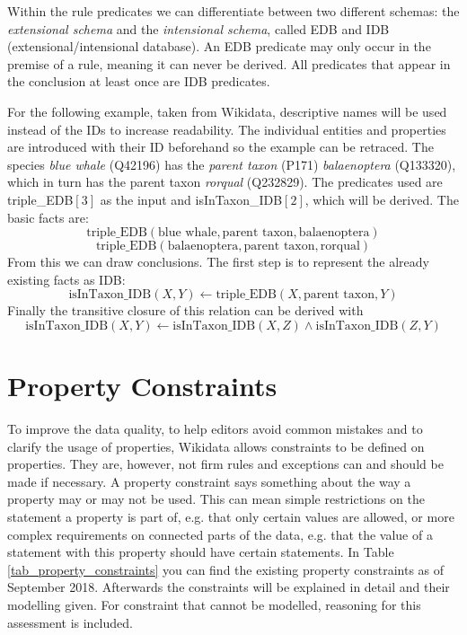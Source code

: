 \documentclass[hyperref,bachelorofscience,fleqn]{cgvpub}
\begin{document}
Within the rule predicates we can differentiate between two different schemas: the \emph{extensional schema} and the \emph{intensional schema}, called EDB and IDB (extensional/intensional database). An EDB predicate may only occur in the premise of a rule, meaning it can never be derived. All predicates that appear in the conclusion at least once are IDB predicates.

For the following example, taken from Wikidata, descriptive names will be used instead of the IDs to increase readability. The individual entities and properties are introduced with their ID beforehand so the example can be retraced. The species \emph{blue whale} (Q42196) has the \emph{parent taxon} (P171) \emph{balaenoptera} (Q133320), which in turn has the parent taxon \emph{rorqual} (Q232829). The predicates used are triple\_EDB\([3]\) as the input and isInTaxon\_IDB\([2]\), which will be derived. The basic facts are:
\[\text{triple\_EDB}(\text{blue whale}, \text{parent taxon}, \text{balaenoptera})\]
\[\text{triple\_EDB}(\text{balaenoptera}, \text{parent taxon}, \text{rorqual})\]
From this we can draw conclusions. The first step is to represent the already existing facts as IDB:
\[\text{isInTaxon\_IDB}(X, Y) \leftarrow \text{triple\_EDB}(X, \text{parent taxon}, Y)\]
Finally the transitive closure of this relation can be derived with
\[\text{isInTaxon\_IDB}(X, Y) \leftarrow \text{isInTaxon\_IDB}(X, Z) \wedge \text{isInTaxon\_IDB}(Z, Y)\]

\chapter{Property Constraints}

To improve the data quality, to help editors avoid common mistakes and to clarify the usage of properties, Wikidata allows constraints to be defined on properties. They are, however, not firm rules and exceptions can and should be made if necessary. A property constraint says something about the way a property may or may not be used. This can mean simple restrictions on the statement a property is part of, e.g. that only certain values are allowed, or more complex requirements on connected parts of the data, e.g. that the value of a statement with this property should have certain statements. In Table \ref{tab_property_constraints} you can find the existing property constraints as of September 2018. Afterwards the constraints will be explained in detail and their modelling given. For constraint that cannot be modelled, reasoning for this assessment is included.
\end{document}
